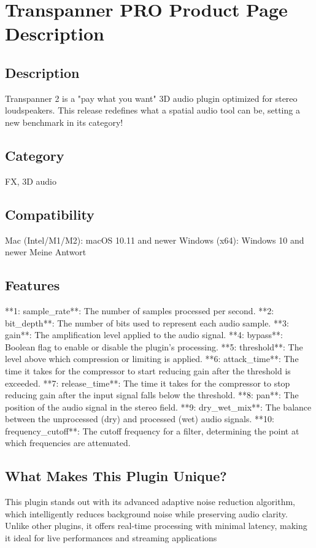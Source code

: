 \documentclass[8pt]{article}
\begin{document}
{{{{    \section*{Transpanner PRO  Product Page Description}

    \subsection*{Description}
    Transpanner 2 is a "pay what you want" 3D audio plugin optimized for stereo loudspeakers. This release redefines what a spatial audio tool can be, setting a new benchmark in its category!

    \subsection*{Category}
    FX, 3D audio

    \subsection*{Compatibility}
    Mac (Intel/M1/M2): macOS 10.11 and newer
Windows (x64): Windows 10 and newer
Meine Antwort


    \subsection*{Features}
    **1: sample_rate**: The number of samples processed per second.
**2: bit_depth**: The number of bits used to represent each audio sample.
**3: gain**: The amplification level applied to the audio signal.
**4: bypass**: Boolean flag to enable or disable the plugin’s processing.
**5: threshold**: The level above which compression or limiting is applied.
**6: attack_time**: The time it takes for the compressor to start reducing gain after the threshold is exceeded.
**7: release_time**: The time it takes for the compressor to stop reducing gain after the input signal falls below the threshold.
**8: pan**: The position of the audio signal in the stereo field.
**9: dry_wet_mix**: The balance between the unprocessed (dry) and processed (wet) audio signals.
**10: frequency_cutoff**: The cutoff frequency for a filter, determining the point at which frequencies are attenuated.

    \subsection*{What Makes This Plugin Unique?}
    This plugin stands out with its advanced adaptive noise reduction algorithm, which intelligently reduces background noise while preserving audio clarity. Unlike other plugins, it offers real-time processing with minimal latency, making it ideal for live performances and streaming applications

}}}}
\end{document}
